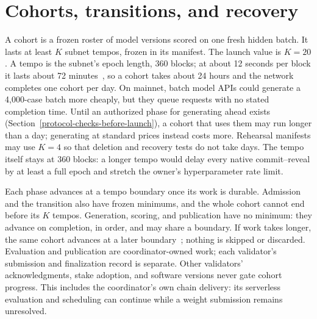 \section{Cohorts, transitions, and recovery}\label{cohort-recovery}\label{cohorts}

A cohort is a frozen roster of model versions scored on one fresh hidden batch.
It lasts at least \(K\) subnet tempos, frozen in its manifest. The launch value
is \(K=20\). A tempo is the subnet's epoch length, 360 blocks; at about 12 seconds
per block it lasts about 72 minutes~\cite{tempo}, so a cohort takes about 24 hours
and the network completes one cohort per day. On mainnet, batch model APIs
could generate a 4,000-case batch more cheaply, but they queue requests with no
stated completion time. Until an authorized phase for generating ahead exists
(Section~\ref{protocol-checks-before-launch}), a cohort that uses them may run
longer than a day; generating at standard prices instead costs more. Rehearsal manifests may use
\(K=4\) so that deletion and recovery tests do not take days. The tempo itself
stays at 360 blocks: a longer tempo would delay every native commit--reveal by
at least a full epoch and stretch the owner's hyperparameter rate limit.

Each phase advances at a tempo boundary once its work is durable. Admission and
the transition also have frozen minimums, and the whole cohort cannot end
before its \(K\) tempos. Generation, scoring, and publication have no minimum:
they advance on completion, in order, and may share a boundary. If work takes
longer, the same cohort advances at a later boundary~\cite{tempo}; nothing is
skipped or discarded. Evaluation and publication are coordinator-owned work;
each validator's submission and finalization record is separate. Other
validators' acknowledgments, stake adoption, and software versions never gate
cohort progress. This includes the coordinator's own chain delivery: its
serverless evaluation and scheduling can continue while a weight submission
remains unresolved.

